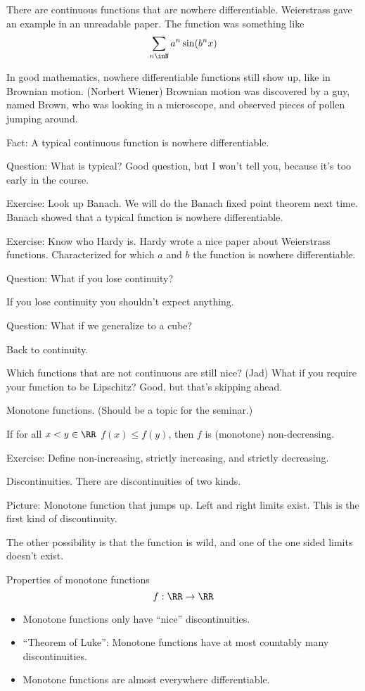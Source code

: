 \documentclass{article}
\begin{document}
There are continuous functions that are nowhere differentiable. Weierstrass gave an example in
an unreadable paper. The function was something like
\[ \sum_{n\inN} a^n \sin(b^n x) \]

In good mathematics, nowhere differentiable functions still show up,
like in Brownian motion. (Norbert Wiener) Brownian motion was
discovered by a guy, named Brown, who was looking in a microscope,
and observed pieces of pollen jumping around.

Fact: A typical continuous function is nowhere differentiable.

Question: What is typical? Good question, but I won't tell you,
because it's too early in the course.

Exercise: Look up Banach. We will do the Banach fixed point theorem
next time. Banach showed that a typical function is nowhere
differentiable.

Exercise: Know who Hardy is. Hardy wrote a nice paper about
Weierstrass functions. Characterized for which $a$ and $b$
the function is nowhere differentiable.

Question: What if you lose continuity? 

If you lose continuity you shouldn't expect anything.

Question: What if we generalize to a cube?

Back to continuity. 

Which functions that are not continuous are still nice?
(Jad) What if you require your function to be Lipschitz?
Good, but that's skipping ahead.

Monotone functions. (Should be a topic for the seminar.)

\begin{definition}
    If for all $x<y\in\RR$ $f(x) \le f(y)$, then
    $f$ is (monotone) non-decreasing.
\end{definition}

Exercise: Define non-increasing, strictly increasing, 
and strictly decreasing.

Discontinuities. There are discontinuities of two kinds.

Picture: Monotone function that jumps up. Left and right limits
exist. This is the first kind of discontinuity.

The other possibility is that the function is wild, and one of
the one sided limits doesn't exist.

Properties of monotone functions 
\[ f: \RR\to\RR \]
\begin{itemize}
    \item Monotone functions only have ``nice'' discontinuities.
    \item ``Theorem of Luke'': Monotone functions have at most
        countably many discontinuities.
    \item Monotone functions are almost everywhere
        differentiable.
\end{itemize}
\end{document}
